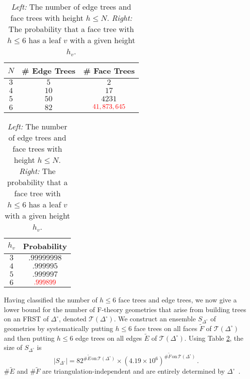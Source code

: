 \documentclass[aps,prl,twocolumn, superscriptaddress,groupedaddress,nofootinbib]{revtex4-1}
\begin{document}
\begin{table}
\begin{tabular}{|c|c|c|}
\hline
$N$ & \# Edge Trees & \# Face Trees \\ \hline
$3$ & $5$ & $2$\\
$4$ & $10$ & $17$\\
$5$ & $50$ & $4231$ \\
$6$ & $82$ & ${\color{red}41,873,645}$\\ \hline
\end{tabular} \hspace{1cm}
\begin{tabular}{|c|c|}
\hline
$h_v$ & Probability \\ \hline
$3$ & $.99999998$ \\
$4$ & $.999995$ \\
$5$ & $.999997$  \\
$6$ & ${\color{red}.999899}$ \\ \hline
\end{tabular}
\caption{\emph{Left:} The number of edge trees and face trees with height $h\leq N$.
\emph{Right:} The probability that a face tree with $h\leq 6$ has a leaf $v$ with
a given height $h_v$.}
\label{tab:numedgefacetreeandprob}
\end{table}



\vspace{.5cm}
Having classified the number of $h\leq 6$ face trees and edge trees, we now give a lower bound for
the number of F-theory geometries that arise from building trees on an FRST of 
$\Delta^\circ$, {\color{red}denoted $\mathcal{T}(\Delta^\circ)$}. 
We construct an ensemble $S_{\Delta^\circ}$ of geometries by systematically putting $h\leq 6$ face trees on all
faces $\tilde F$ of $\mathcal{T}(\Delta^\circ)$ and then putting $h\leq 6$ edge trees on
all edges $\tilde E$ of $\mathcal{T}(\Delta^\circ)$. Using Table \ref{tab:numedgefacetreeandprob}, the size of $S_{\Delta^\circ}$ is {\color{red}
\begin{equation}
|S_{\Delta^\circ}| = 82^{\# \tilde E \, \text{on} \, \mathcal{T}(\Delta^\circ)} \times (4.19\times 10^6)^{\# \tilde F \, \text{on} \, \mathcal{T}(\Delta^\circ)}\, . 
\end{equation}
$\# \tilde E$ and $\# \tilde F $ are triangulation-independent and are entirely determined by $\Delta^\circ$~\cite{DeLoera:2010:TSA:1952022}}.
\end{document}
